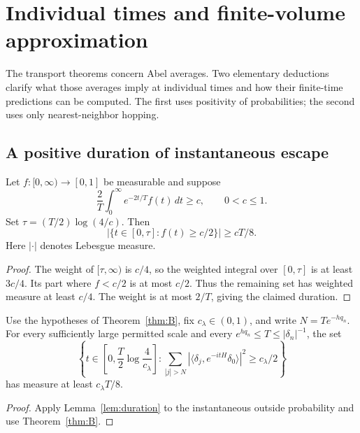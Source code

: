 \section{Individual times and finite-volume approximation}\label{sec:finitetime}

The transport theorems concern Abel averages. Two elementary deductions clarify what those averages imply at individual times and how their finite-time predictions can be computed. The first uses positivity of probabilities; the second uses only nearest-neighbor hopping.

\subsection{A positive duration of instantaneous escape}

\begin{lemma}\label{lem:duration}
Let $f:[0,\infty)\to[0,1]$ be measurable and suppose
\[
\frac2T\int_0^\infty e^{-2t/T}f(t)\,dt\ge c,\qquad 0<c\le1.
\]
Set $\tau=(T/2)\log(4/c)$. Then
\[
\left|\{t\in[0,\tau]:f(t)\ge c/2\}\right|\ge cT/8.
\]
Here $|\cdot|$ denotes Lebesgue measure.
\end{lemma}
\begin{proof}
The weight of $[\tau,\infty)$ is $c/4$, so the weighted integral over $[0,\tau]$ is at least $3c/4$. Its part where $f<c/2$ is at most $c/2$. Thus the remaining set has weighted measure at least $c/4$. The weight is at most $2/T$, giving the claimed duration.
\end{proof}

\begin{corollary}\label{cor:instant}
Use the hypotheses of Theorem~\ref{thm:B}, fix $c_\lambda\in(0,1)$, and write $N=Te^{-hq_n}$.
For every sufficiently large permitted scale and every
$e^{hq_n}\le T\le|\delta_n|^{-1}$, the set
\[
\left\{t\in\left[0,\frac T2\log\frac4{c_\lambda}\right]:
\sum_{|j|>N}|\langle\delta_j,e^{-itH}\delta_0\rangle|^2
\ge c_\lambda/2\right\}
\]
has measure at least $c_\lambda T/8$.
\end{corollary}
\begin{proof}
Apply Lemma~\ref{lem:duration} to the instantaneous outside probability and use Theorem~\ref{thm:B}.
\end{proof}

